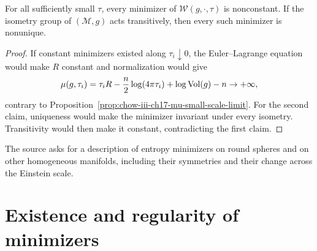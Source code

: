 \begin{lemma}
\label{lem:chow-iii-ch17-small-minimizer-nonconstant-nonunique}
For all sufficiently small $\tau$, every minimizer of
$\mathcal W(g,\cdot,\tau)$ is nonconstant.  If the isometry group of
$(\mathcal M,g)$ acts transitively, then every such minimizer is nonunique.
\end{lemma}
\begin{proof}
If constant minimizers existed along $\tau_i\downarrow0$, the
Euler--Lagrange equation would make $R$ constant and normalization would give
\[
 \mu(g,\tau_i)=\tau_iR-\frac n2\log(4\pi\tau_i)+\log\operatorname{Vol}(g)-n\to+\infty,
\]
contrary to Proposition~\ref{prop:chow-iii-ch17-mu-small-scale-limit}.
For the second claim, uniqueness would make the minimizer invariant under
every isometry.  Transitivity would then make it constant, contradicting the
first claim.
\end{proof}

\begin{remark}
\label{rem:chow-iii-ch17-homogeneous-minimizer-problem}
The source asks for a description of entropy minimizers on round spheres and
on other homogeneous manifolds, including their symmetries and their change
across the Einstein scale.
\end{remark}

\section{Existence and regularity of minimizers}


